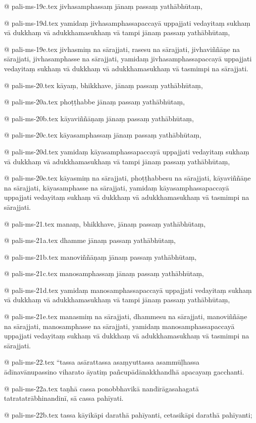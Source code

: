 @ pali-ms-19c.tex
jivhasamphassaṃ jānaṃ passaṃ yathābhūtaṃ,

@ pali-ms-19d.tex
yamidaṃ jivhasamphassapaccayā uppajjati vedayitaṃ sukhaṃ vā dukkhaṃ vā adukkhamasukhaṃ vā tampi jānaṃ passaṃ yathābhūtaṃ,

@ pali-ms-19e.tex
jivhasmiṃ na sārajjati, rasesu na sārajjati, jivhaviññāṇe na sārajjati, jivhasamphasse na sārajjati, yamidaṃ jivhasamphassapaccayā uppajjati vedayitaṃ sukhaṃ vā dukkhaṃ vā adukkhamasukhaṃ vā tasmimpi na sārajjati.

@ pali-ms-20.tex
kāyaṃ, bhikkhave, jānaṃ passaṃ yathābhūtaṃ,

@ pali-ms-20a.tex
phoṭṭhabbe jānaṃ passaṃ yathābhūtaṃ,

@ pali-ms-20b.tex
kāyaviññāṇaṃ jānaṃ passaṃ yathābhūtaṃ,

@ pali-ms-20c.tex
kāyasamphassaṃ jānaṃ passaṃ yathābhūtaṃ,

@ pali-ms-20d.tex
yamidaṃ kāyasamphassapaccayā uppajjati vedayitaṃ sukhaṃ vā dukkhaṃ vā adukkhamasukhaṃ vā tampi jānaṃ passaṃ yathābhūtaṃ,

@ pali-ms-20e.tex
kāyasmiṃ na sārajjati, phoṭṭhabbesu na sārajjati, kāyaviññāṇe na sārajjati, kāyasamphasse na sārajjati, yamidaṃ kāyasamphassapaccayā uppajjati vedayitaṃ sukhaṃ vā dukkhaṃ vā adukkhamasukhaṃ vā tasmimpi na sārajjati.

@ pali-ms-21.tex
manaṃ, bhikkhave, jānaṃ passaṃ yathābhūtaṃ,

@ pali-ms-21a.tex
dhamme jānaṃ passaṃ yathābhūtaṃ,

@ pali-ms-21b.tex
manoviññāṇaṃ jānaṃ passaṃ yathābhūtaṃ,

@ pali-ms-21c.tex
manosamphassaṃ jānaṃ passaṃ yathābhūtaṃ,

@ pali-ms-21d.tex
yamidaṃ manosamphassapaccayā uppajjati vedayitaṃ sukhaṃ vā dukkhaṃ vā adukkhamasukhaṃ vā tampi jānaṃ passaṃ yathābhūtaṃ,

@ pali-ms-21e.tex
manasmiṃ na sārajjati, dhammesu na sārajjati, manoviññāṇe na sārajjati, manosamphasse na sārajjati, yamidaṃ manosamphassapaccayā uppajjati vedayitaṃ sukhaṃ vā dukkhaṃ vā adukkhamasukhaṃ vā tasmimpi na sārajjati.

@ pali-ms-22.tex
“tassa asārattassa asaṃyuttassa asammūḷhassa ādīnavānupassino viharato āyatiṃ pañcupādānakkhandhā apacayaṃ gacchanti.

@ pali-ms-22a.tex
taṇhā cassa ponobbhavikā nandīrāgasahagatā tatratatrābhinandinī, sā cassa pahīyati.

@ pali-ms-22b.tex
tassa kāyikāpi darathā pahīyanti, cetasikāpi darathā pahīyanti;

